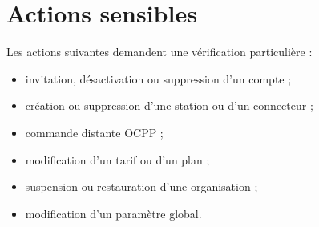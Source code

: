 \section{Actions sensibles}

Les actions suivantes demandent une vérification particulière :

\begin{itemize}[leftmargin=*]
  \item invitation, désactivation ou suppression d'un compte ;
  \item création ou suppression d'une station ou d'un connecteur ;
  \item commande distante OCPP ;
  \item modification d'un tarif ou d'un plan ;
  \item suspension ou restauration d'une organisation ;
  \item modification d'un paramètre global.
\end{itemize}

